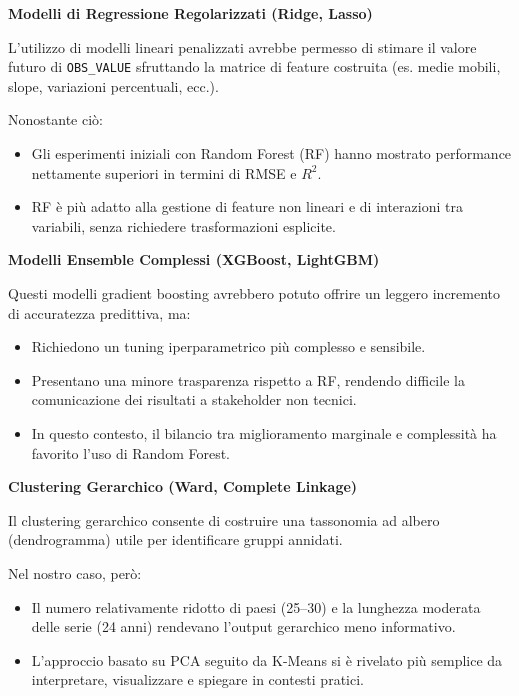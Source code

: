 \documentclass[conference]{IEEEtran}
\begin{document}
{\vspace{1em}\noindent\textbf{Modelli di Regressione Regolarizzati (Ridge, Lasso)}

L’utilizzo di modelli lineari penalizzati avrebbe permesso di stimare il valore futuro di \texttt{OBS\_VALUE} sfruttando la matrice di feature costruita (es. medie mobili, slope, variazioni percentuali, ecc.).

Nonostante ciò:
\begin{itemize}
    \item Gli esperimenti iniziali con Random Forest (RF) hanno mostrato performance nettamente superiori in termini di RMSE e $R^2$.
    \item RF è più adatto alla gestione di feature non lineari e di interazioni tra variabili, senza richiedere trasformazioni esplicite.
\end{itemize}

\vspace{1em}\noindent\textbf{Modelli Ensemble Complessi (XGBoost, LightGBM)}

Questi modelli gradient boosting avrebbero potuto offrire un leggero incremento di accuratezza predittiva, ma:

\begin{itemize}
    \item Richiedono un tuning iperparametrico più complesso e sensibile.
    \item Presentano una minore trasparenza rispetto a RF, rendendo difficile la comunicazione dei risultati a stakeholder non tecnici.
    \item In questo contesto, il bilancio tra miglioramento marginale e complessità ha favorito l’uso di Random Forest.
\end{itemize}

\vspace{1em}\noindent\textbf{Clustering Gerarchico (Ward, Complete Linkage)}

Il clustering gerarchico consente di costruire una tassonomia ad albero (dendrogramma) utile per identificare gruppi annidati.

Nel nostro caso, però:
\begin{itemize}
    \item Il numero relativamente ridotto di paesi (25–30) e la lunghezza moderata delle serie (24 anni) rendevano l’output gerarchico meno informativo.
    \item L’approccio basato su PCA seguito da K-Means si è rivelato più semplice da interpretare, visualizzare e spiegare in contesti pratici.
\end{itemize}

}
\end{document}
